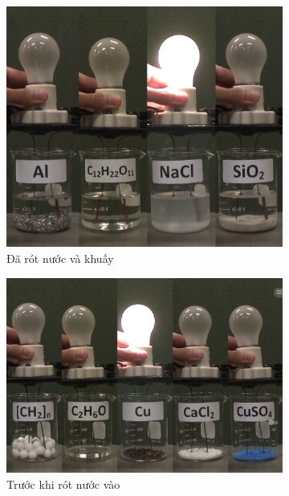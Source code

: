 \begin{figure}[!htp]
\begin{hopdongian}[\mauphu]
\begin{center}
\begin{subfigure}[b]{0.23\textwidth}
				\includegraphics[height=0.7\textwidth]{Images/anhhoa11/dodandien_2.png}
				\caption{Đã rót nước và khuấy}
				\label{subfig:TNsudienli2}
			\end{subfigure}
			\hspace*{0.5cm}
			\begin{subfigure}[b]{0.23\textwidth}
				\centering
				\includegraphics[height=0.7\textwidth]{Images/anhhoa11/dodandien_3.png}
				\caption{Trước khi rót nước vào}
				\label{subfig:TNsudienli3}
			\end{subfigure}
			\hspace*{0.25cm}
			\begin{subfigure}[b]{0.23\textwidth}
				\centering

\end{subfigure}
\end{center}
\end{hopdongian}
\end{figure}
